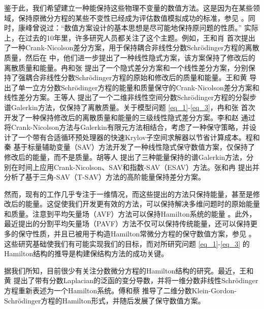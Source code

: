  鉴于此，我们希望建立一种能保持这些物理不变量的数值方法。这是因为在某些领域，保持原微分方程的某些不变性已经成为评估数值模拟成功的标准，参见 \cite{liFiniteDifferenceCalculus1995}。同时，康峰曾说过：“数值方案设计的基本思想是尽可能地保持原问题的性质。” 实际上，在过去的10年里，许多研究人员都关注了这个主题。例如，王和肖 \cite{wangCrankNicolsonDifference2013} 首次提出了一种Crank-Nicolson差分方案，用于保持耦合非线性分数Schr{\"o}dinger方程的离散质量，然后在 \cite{wangLinearlyImplicitConservative2014} 中，他们进一步提出了一种线性隐式方案，该方案保持了修改后的离散质量和能量。冉和张 \cite{ranConservativeDifferenceScheme2016} 提出了一个隐式差分方案和一个线性差分方案，分别保持了强耦合非线性分数Schr{\"o}dinger方程的原始和修改后的质量和能量。王和黄 \cite{wangEnergyConservativeDifference2015,wangConservativeLinearizedDifference2015} 导出了单一立方分数Schr{\"o}dinger方程的能量和质量保守的Crank-Nicolson差分方案和线性差分方案。王等人 \cite{wangSplitstepSpectralGalerkin2019} 提出了一个二维非线性空间分数Schr{\"o}dinger方程的分裂步谱Galerkin方法，仅保持了离散质量。关于模型问题 \eqref{eq_1}-\eqref{eq_3}，冉和张 \cite{ranLinearlyImplicitConservative2016} 首次开发了一种保持修改后的离散质量和能量的三级线性隐式差分方案。李和赵 \cite{liFastEnergyConserving2018} 通过将Crank-Nicolson方法与Galerkin有限元方法相结合，考虑了一种保守策略，并设计了一个带有合适循环预处理器的快速Krylov子空间求解器以节省计算成本。程和秦 \cite{chengConvergenceEnergyconservingScheme2022} 基于标量辅助变量（SAV）方法开发了一种线性隐式保守数值方案，仅保持了修改后的能量，而不是质量。胡等人 \cite{huEfficientEnergyPreserving2022} 提出了三种能量保持的谱Galerkin方法，分别在时间上应用Crank-Nicolson、SAV和指数-SAV（ESAV）方法。张和冉 \cite{zhangHighorderStructurepreservingDifference2023} 提出并分析了基于三角-SAV（T-SAV）方法的高阶能量保持差分方案。

然而，现有的工作几乎专注于一维情况，而这些提出的方法只保持能量，甚至是修改后的能量。这促使我们开发更有效的方法，可以保持解决多维问题时的原始能量和质量。注意到平均矢量场（AVF）方法可以保持Hamilton系统的能量 \cite{buddGeometricIntegrationUsing1999,quispelNewClassEnergypreserving2008}。此外，最近提出的分割平均矢量场（PAVF）方法不仅可以保持传统能量，还可以保持更多的保守性质，并且已被用于构造Hamilton常微分方程的保守数值方案，参见 \cite{caiPartitionedAveragedVector2018}。这些研究基础使我们有可能实现我们的目标，而对所研究问题 \eqref{eq_1}-\eqref{eq_3} 的Hamilton结构的推导是构建保结构方法的成功关键。

据我们所知，目前很少有关注分数微分方程的Hamilton结构的研究。最近，王和黄 \cite{wangStructurepreservingNumericalMethods2018} 提出了带有分数Laplacian的泛函的变分导数，并将一维分数非线性Schr{\"o}dinger方程重新表述为一个Hamilton系统。傅和蔡 \cite{fuStructurepreservingAlgorithmsTwodimensional2020} 推导了二维分数Klein-Gordon-Schr{\"o}dinger方程的Hamilton形式，并随后发展了保守数值方案。

